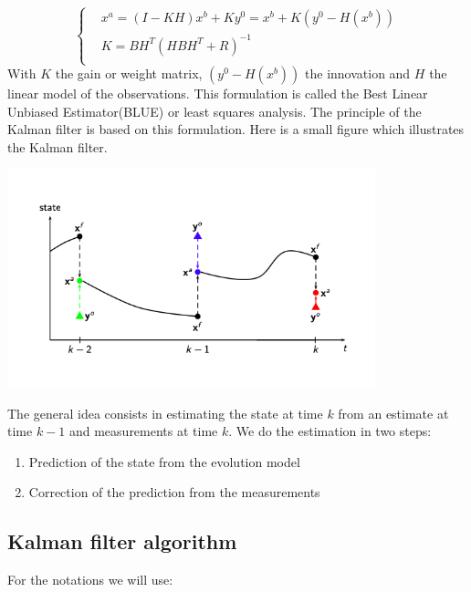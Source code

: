 \documentclass{article}
\begin{document}
$$\left\{\begin{aligned}
		&x^a=(I-KH)x^b+Ky^0=x^b+K(y^0-H(x^b)) \\
        &K=BH^T(HBH^T+R)^{-1} \\
	\end{aligned}\right.$$
With $K$ the gain or weight matrix, $(y^0-H(x^b))$ the innovation and $H$ the linear model of the observations.
This formulation is called the Best Linear Unbiased Estimator(BLUE) or least squares analysis.
The principle of the Kalman filter is based on this formulation. Here is a small figure which illustrates the Kalman filter.
\vspace*{5mm}
\begin{center}
		\includegraphics[width=0.8\textwidth]{"images/schema_kalman_filter.png"}
	\end{center}
The general idea consists in estimating the state at time $k$ from an estimate at time $k-1$ and measurements at time $k$.
We do the estimation in two steps:
\begin{enumerate}[label=\textbullet]
		\item Prediction of the state from the evolution model
		\item Correction of the prediction from the measurements
	\end{enumerate}

\subsection{Kalman filter algorithm}
For the notations we will use:
\end{document}
